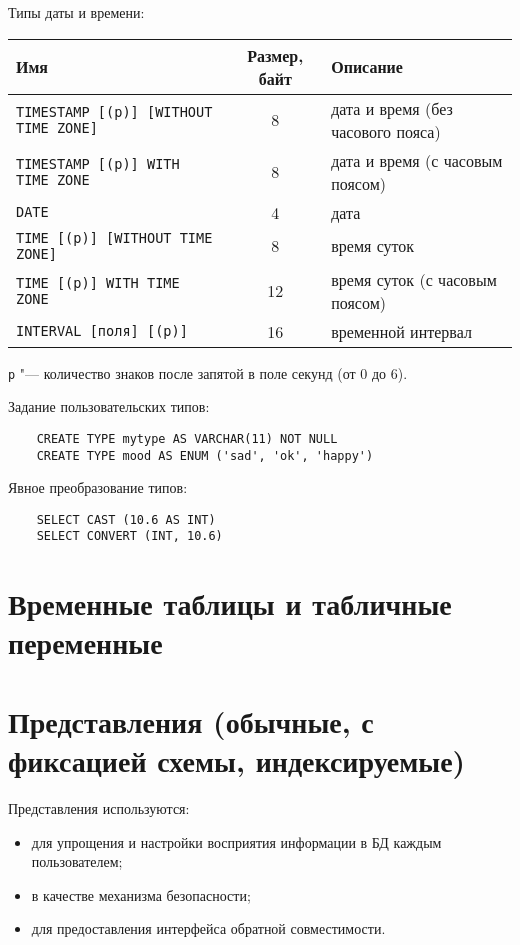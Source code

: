 \vspace{1em}

Типы даты и времени: \\
\begin{tabular}{l | c | l}
	\textbf{Имя} & \textbf{Размер, байт} & \textbf{Описание} \\
	\hline
	\texttt{TIMESTAMP [(p)] [WITHOUT TIME ZONE]} & 8 & дата и время (без часового пояса) \\
	\texttt{TIMESTAMP [(p)] WITH TIME ZONE} & 8 & дата и время (с часовым поясом) \\
	\texttt{DATE} & 4 & дата \\
	\texttt{TIME [(p)] [WITHOUT TIME ZONE]} & 8 & время суток \\
	\texttt{TIME [(p)] WITH TIME ZONE} & 12 & время суток (с часовым поясом) \\
	\texttt{INTERVAL [поля] [(p)]} & 16 & временной интервал
\end{tabular}

\texttt{p} "--- количество знаков после запятой в поле секунд (от 0 до 6).

Задание пользовательских типов:
\begin{verbatim}
	CREATE TYPE mytype AS VARCHAR(11) NOT NULL
	CREATE TYPE mood AS ENUM ('sad', 'ok', 'happy')
\end{verbatim}

Явное преобразование типов:
\begin{verbatim}
	SELECT CAST (10.6 AS INT)
	SELECT CONVERT (INT, 10.6)
\end{verbatim}

\section{Временные таблицы и табличные переменные}


\section{Представления (обычные, с фиксацией схемы, индексируемые)}

Представления используются:
\begin{itemize}
	\item для упрощения и настройки восприятия информации в БД каждым пользователем;
	\item в качестве механизма безопасности;
	\item для предоставления интерфейса обратной совместимости.
\end{itemize}

